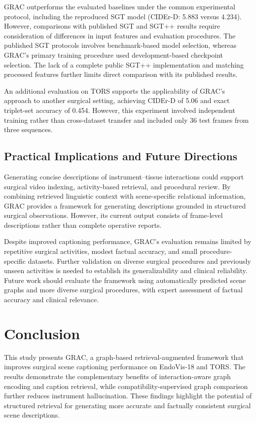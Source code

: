 \documentclass[11pt]{article}
\begin{document}
GRAC outperforms the evaluated baselines under the common experimental protocol, including the reproduced SGT model (CIDEr-D: 5.883 versus 4.234). However, comparisons with published SGT and SGT++ results require consideration of differences in input features and evaluation procedures. The published SGT protocols involves benchmark-based model selection, whereas GRAC's primary training procedure used development-based checkpoint selection.  The lack of a complete public SGT++ implementation and matching processed features further limits direct comparison with its published results.

An additional evaluation on TORS supports the applicability of GRAC's approach to another surgical setting, achieving CIDEr-D of 5.06 and exact triplet-set accuracy of 0.454. However, this experiment involved independent training rather than cross-dataset transfer and included only 36 test frames from three sequences.

\subsection{Practical Implications and Future Directions}\label{subsec6.4}

Generating concise descriptions of instrument--tissue interactions could support surgical video indexing, activity-based retrieval, and procedural review. By combining retrieved linguistic context with scene-specific relational information, GRAC provides a framework for generating descriptions grounded in structured surgical observations. However, its current output consists of frame-level descriptions rather than complete operative reports.

Despite improved captioning performance, GRAC's evaluation remains limited by repetitive surgical activities, modest factual accuracy, and small procedure-specific datasets. Further validation on diverse surgical procedures and previously unseen activities is needed to establish its generalizability and clinical reliability. Future work should evaluate the framework using automatically predicted scene graphs and more diverse surgical procedures, with expert assessment of factual accuracy and clinical relevance.


\section{Conclusion}\label{sec7}

This study presents GRAC, a graph-based retrieval-augmented framework that improves surgical scene captioning performance on EndoVis-18 and TORS. The results demonstrate the complementary benefits of interaction-aware graph encoding and caption retrieval, while compatibility-supervised graph comparison further reduces instrument hallucination. These findings highlight the potential of structured retrieval for generating more accurate and factually consistent surgical scene descriptions.
\end{document}
